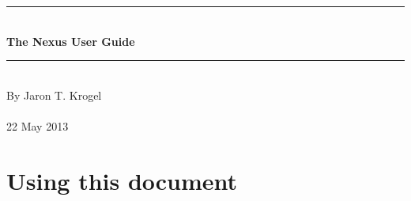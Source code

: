 \documentclass[oneside,11pt]{memoir}
\numberwithin{equation}{section}
\newcommand{\HRule}{\rule{\linewidth}{0.5mm}}
\newenvironment{changemargin}[2]{%
\begin{list}{}{%
\setlength{\leftmargin}{#1}%
\setlength{\rightmargin}{#2}%
}%
\item[]}{\end{list}}
\begin{document}


\thispagestyle{empty}
\begin{changemargin}{-1cm}{-1cm}
  \begin{center}
    \hspace{1cm}\\
    \hspace{1cm}\\
    \hspace{1cm}\\
    \hspace{1cm}\\
    \hspace{1cm}\\
    \hspace{1cm}\\
    \hspace{1cm}\\
    \hspace{1cm}\\
    \hspace{1cm}\\
    \hspace{1cm}\\
    \hspace{1cm}\\
    \hspace{1cm}\\
    \HRule\\
    \vspace{4mm}
    \textbf{\fontsize{40}{45}\selectfont The Nexus User Guide} \\ 
    \HRule\\
    \vspace{1cm}
    \vspace{6cm}
    By Jaron T. Krogel \\
    \hspace{1cm}\\
    22 May 2013
  \end{center}
\end{changemargin}
\pagebreak

\tableofcontents



\mainmatter

\pagebreak
\chapter{Using this document} \label{usedoc}
\end{document}
